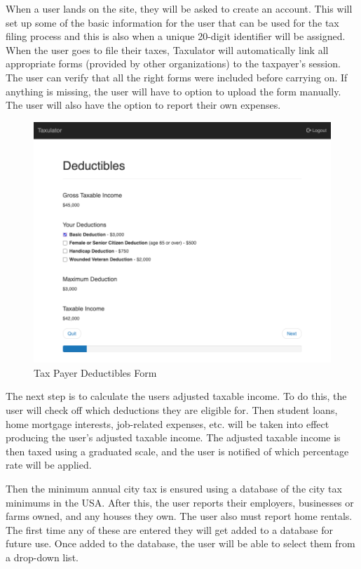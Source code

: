 \documentclass[sigconf]{acmart}
\begin{document}
When a user lands on the site, they will be asked to create an account. This will set up some of the basic information for the user that can be used for the tax filing process and this is also when a unique 20-digit identifier will be assigned. When the user goes to file their taxes, Taxulator will automatically link all appropriate forms (provided by other organizations) to the taxpayer’s session. The user can verify that all the right forms were included before carrying on. If anything is missing, the user will have to option to upload the form manually. The user will also have the option to report their own expenses.

\begin{figure}[H]
  \centering
  \includegraphics[width=\linewidth]{Images/Form2.png}
  \caption{Tax Payer Deductibles Form}
  \label{TaxableIncome}
\end{figure}

The next step is to calculate the users adjusted taxable income. To do this, the user will check off which deductions they are eligible for. Then student loans, home mortgage interests, job-related expenses, etc. will be taken into effect producing the user’s adjusted taxable income. The adjusted taxable income is then taxed using a graduated scale, and the user is notified of which percentage rate will be applied.

Then the minimum annual city tax is ensured using a database of the city tax minimums in the USA. After this, the user reports their employers, businesses or farms owned, and any houses they own. The user also must report home rentals. The first time any of these are entered they will get added to a database for future use. Once added to the database, the user will be able to select them from a drop-down list.
\end{document}
